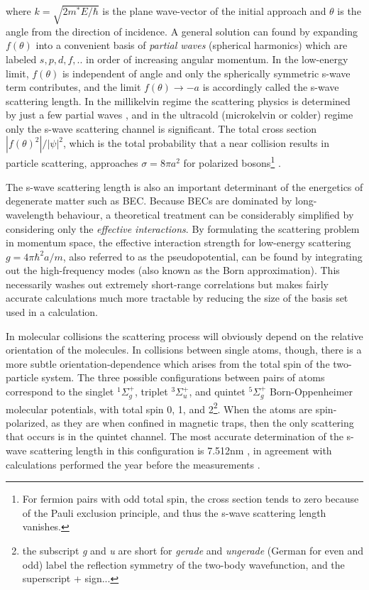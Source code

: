 	where $k=\sqrt{2m^*E/\hbar}$ is the plane wave-vector of the initial approach and $\theta$ is the angle from the direction of incidence. A general solution can found by expanding $f(\theta)$ into a convenient basis of \emph{partial waves} (spherical harmonics) which are labeled $s,p,d,f,..$ in order of increasing angular momentum. In the low-energy limit, $f(\theta)$ is independent of angle and only the spherically symmetric s-wave term contributes, and the limit $f(\theta)\rightarrow-a$ is accordingly called the s-wave scattering length. In the millikelvin regime the scattering physics is determined by just a few partial waves \cite{mcnamara07}, and in the ultracold (microkelvin or colder) regime only the s-wave scattering channel is significant. The total cross section $|f(\theta)^2|/|\psi|^2$, which is the total probability that a near collision results in particle scattering, approaches $\sigma=8\pi a^2$ for polarized bosons\footnote{For fermion pairs with odd total spin, the cross section tends to zero because of the Pauli exclusion principle, and thus the s-wave scattering length vanishes.} \cite{przybytek05}. 

	The s-wave scattering length is also an important determinant of the energetics of degenerate matter such as BEC. Because BECs are dominated by long-wavelength behaviour, a theoretical treatment can be considerably simplified by considering only the \emph{effective interactions}. By formulating the scattering problem in momentum space, the effective interaction strength for low-energy scattering  $g=4\pi \hbar^2 a/m$, also referred to as the pseudopotential, can be found by integrating out the high-frequency modes (also known as the Born approximation). This necessarily washes out extremely short-range correlations but makes fairly accurate calculations much more tractable by reducing the size of the basis set used in a calculation.

	In molecular collisions the scattering process will obviously depend on the relative orientation of the molecules. In collisions between single atoms, though, there is a more subtle orientation-dependence which arises from the total spin of the two-particle system. The three possible configurations between pairs of \mhe atoms correspond to the singlet $^1\Sigma_g^+$, triplet $^3\Sigma_u^+$, and quintet $^5\Sigma_g^+$ Born-Oppenheimer molecular potentials, with total spin 0, 1, and 2\footnote{the subscript \emph{g} and \emph{u} are short for \emph{gerade} and \emph{ungerade} (German for even and odd) label the reflection symmetry of the two-body wavefunction, and the superscript + sign...}. When the atoms are spin-polarized, as they are when confined in magnetic traps, then the only scattering that occurs is in the quintet channel. The most accurate determination of the s-wave scattering length in this configuration is 7.512nm \cite{moal06}, in agreement with calculations performed the year before the measurements \cite{przybytek05}. 
	
